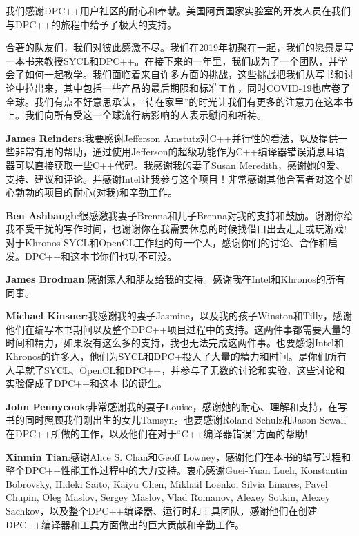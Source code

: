 我们感谢DPC++用户社区的耐心和奉献。美国阿贡国家实验室的开发人员在我们与DPC++的旅程中给予了极大的支持。\par

合著的队友们，我们对彼此感激不尽。我们在2019年初聚在一起，我们的愿景是写一本书来教授SYCL和DPC++。在接下来的一年里，我们成为了一个团队，并学会了如何一起教学。我们面临着来自许多方面的挑战，这些挑战把我们从写书和讨论中拉出来，其中包括一些产品的最后期限和标准工作，同时COVID-19也席卷了全球。我们有点不好意思承认，“待在家里”的时光让我们有更多的注意力在这本书上。我们向所有受这一全球流行病影响的人表示慰问和祈祷。\par

\textbf{James Reinders}:我要感谢Jefferson Amstutz对C++并行性的看法，以及提供一些非常有用的帮助，通过使用Jefferson的超级功能作为C++编译器错误消息耳语器可以直接获取一些C++代码。我感谢我的妻子Susan Meredith，感谢她的爱、支持、建议和评论。并感谢Intel让我参与这个项目！非常感谢其他合著者对这个雄心勃勃的项目的耐心(对我)和辛勤工作。\par

\textbf{Ben Ashbaugh}:很感激我妻子Brenna和儿子Brenna对我的支持和鼓励。谢谢你给我不受干扰的写作时间，也谢谢你在我需要休息的时候找借口出去走走或玩游戏!对于Khronos SYCL和OpenCL工作组的每一个人，感谢你们的讨论、合作和启发。DPC++和这本书你们也功不可没。\par

\textbf{James Brodman}:感谢家人和朋友给我的支持。感谢我在Intel和Khronos的所有同事。\par

\textbf{Michael Kinsner}:我感谢我的妻子Jasmine，以及我的孩子Winston和Tilly，感谢他们在编写本书期间以及整个DPC++项目过程中的支持。这两件事都需要大量的时间和精力，如果没有这么多的支持，我也无法完成这两件事。也要感谢Intel和Khronos的许多人，他们为SYCL和DPC+投入了大量的精力和时间。是你们所有人早就了SYCL、OpenCL和DPC++，并参与了无数的讨论和实验，这些讨论和实验促成了DPC++和这本书的诞生。\par

\textbf{John Pennycook}:非常感谢我的妻子Louise，感谢她的耐心、理解和支持，在写书的同时照顾我们刚出生的女儿Tamsyn。也要感谢Roland Schulz和Jason Sewall在DPC++所做的工作，以及他们在对于“C++编译器错误”方面的帮助!\par

\textbf{Xinmin Tian}:感谢Alice S. Chan和Geoff Lowney，感谢他们在本书的编写过程和整个DPC++性能工作过程中的大力支持。衷心感谢Guei-Yuan Lueh, Konstantin Bobrovsky, Hideki Saito, Kaiyu Chen, Mikhail Loenko, Silvia Linares, Pavel Chupin, Oleg Maslov, Sergey Maslov, Vlad Romanov, Alexey Sotkin, Alexey Sachkov，以及整个DPC++编译器、运行时和工具团队，感谢他们在创建DPC++编译器和工具方面做出的巨大贡献和辛勤工作。\par

